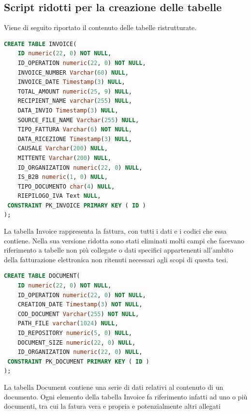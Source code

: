 \subsection{Script ridotti per la creazione delle tabelle}
Viene di seguito riportato il contenuto delle tabelle ristrutturate.\\

\begin{lstlisting}[language=SQL,
        deletekeywords={IDENTITY,INT},
        morekeywords={clustered},    
        framesep=10pt,
        framextopmargin=10pt]
CREATE TABLE INVOICE(
    ID numeric(22, 0) NOT NULL,
    ID_OPERATION numeric(22, 0) NOT NULL,
    INVOICE_NUMBER Varchar(60) NULL,
    INVOICE_DATE Timestamp(3) NULL,
    TOTAL_AMOUNT numeric(25, 9) NULL,
    RECIPIENT_NAME varchar(255) NULL,
    DATA_INVIO Timestamp(3) NULL,
    SOURCE_FILE_NAME Varchar(255) NULL,
    TIPO_FATTURA Varchar(6) NOT NULL,
    DATA_RICEZIONE Timestamp(3) NULL,
    CAUSALE Varchar(200) NULL,
    MITTENTE Varchar(200) NULL,
    ID_ORGANIZATION numeric(22, 0) NULL,
    IS_B2B numeric(1, 0) NULL,
    TIPO_DOCUMENTO char(4) NULL,
    RIEPILOGO_IVA Text NULL,
 CONSTRAINT PK_INVOICE PRIMARY KEY ( ID )
);
\end{lstlisting}
\noindent La tabella Invoice rappresenta la fattura, con tutti i dati e i codici che essa contiene. Nella sua versione ridotta sono stati eliminati molti campi che facevano riferimento a tabelle non più collegate o dati specifici appartenenti all'ambito della fatturazione elettronica non ritenuti necessari agli scopi di questa tesi.\\

\begin{lstlisting}[language=SQL,
        deletekeywords={IDENTITY,INT},
        morekeywords={clustered},    
        framesep=10pt,
        framextopmargin=10pt]
CREATE TABLE DOCUMENT(
    ID numeric(22, 0) NOT NULL,
    ID_OPERATION numeric(22, 0) NOT NULL,
    CREATION_DATE Timestamp(3) NOT NULL,
    COD_DOCUMENT Varchar(255) NOT NULL,
    PATH_FILE varchar(1024) NULL,
    ID_REPOSITORY numeric(5, 0) NULL,
    DOCUMENT_SIZE numeric(22, 0) NULL,
    ID_ORGANIZATION numeric(22, 0) NULL,
 CONSTRAINT PK_DOCUMENT PRIMARY KEY ( ID )
);
\end{lstlisting}
\noindent La tabella Document contiene una serie di dati relativi al contenuto di un documento. Ogni elemento della tabella Invoice fa riferimento infatti ad uno o più documenti, tra cui la fatura vera e propria e potenzialmente altri allegati\\

